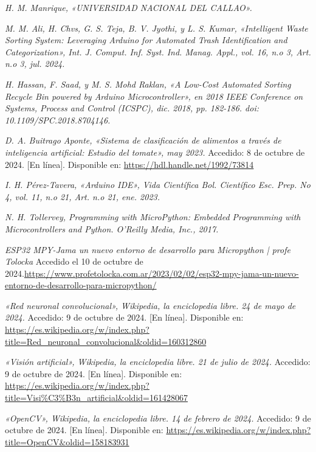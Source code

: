 \begin{thebibliography}{99}
    \textit{H. M. Manrique, «UNIVERSIDAD NACIONAL DEL CALLAO».}
    
    \textit{M. M. Ali, H. Chvs, G. S. Teja, B. V. Jyothi, y L. S. Kumar, «Intelligent Waste Sorting System: Leveraging Arduino for Automated Trash Identification and Categorization», Int. J. Comput. Inf. Syst. Ind. Manag. Appl., vol. 16, n.o 3, Art. n.o 3, jul. 2024.}
    
    \textit{H. Hassan, F. Saad, y M. S. Mohd Raklan, «A Low-Cost Automated Sorting Recycle Bin powered by Arduino Microcontroller», en 2018 IEEE Conference on Systems, Process and Control (ICSPC), dic. 2018, pp. 182-186. doi: 10.1109/SPC.2018.8704146.}
    
    \textit{D. A. Buitrago Aponte, «Sistema de clasificación de alimentos a través de inteligencia artificial: Estudio del tomate», may 2023.} Accedido: 8 de octubre de 2024. [En línea]. Disponible en: \url{https://hdl.handle.net/1992/73814}
    
    \textit{I. H. Pérez-Tavera, «Arduino IDE», Vida Científica Bol. Científico Esc. Prep. No 4, vol. 11, n.o 21, Art. n.o 21, ene. 2023.}
    
    \textit{N. H. Tollervey, Programming with MicroPython: Embedded Programming with Microcontrollers and Python. O’Reilly Media, Inc., 2017.}

    \textit{ESP32 MPY-Jama un nuevo entorno de desarrollo para Micropython | profe Tolocka} Accedido el 10 de octubre de 2024.\url{https://www.profetolocka.com.ar/2023/02/02/esp32-mpy-jama-un-nuevo-entorno-de-desarrollo-para-micropython/}
    
    \textit{«Red neuronal convolucional», Wikipedia, la enciclopedia libre. 24 de mayo de 2024.} Accedido: 9 de octubre de 2024. [En línea]. Disponible en: \url{https://es.wikipedia.org/w/index.php?title=Red_neuronal_convolucional&oldid=160312860}
    
    \textit{«Visión artificial», Wikipedia, la enciclopedia libre. 21 de julio de 2024.} Accedido: 9 de octubre de 2024. [En línea]. Disponible en: \url{https://es.wikipedia.org/w/index.php?title=Visi%C3%B3n_artificial&oldid=161428067}
    
    \textit{«OpenCV», Wikipedia, la enciclopedia libre. 14 de febrero de 2024.} Accedido: 9 de octubre de 2024. [En línea]. Disponible en: \url{https://es.wikipedia.org/w/index.php?title=OpenCV&oldid=158183931}
    

\end{thebibliography}

